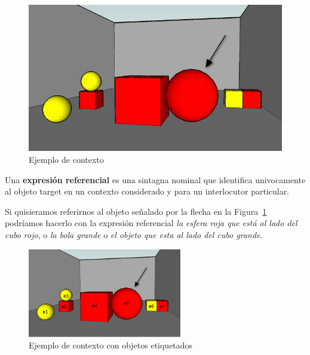  
\begin{figure}[ht]
\centering
\includegraphics[scale=.4]{images/22sinletras.jpg}
\caption{Ejemplo de contexto}
\label{GRE3D7-stimulus1}

\end{figure}

%

Una {\bf expresi\'on referencial} es una sintagna nominal que identifica univocamente al objeto target en un contexto considerado y para un interlocutor particular.

Si quisieramos referirnos al objeto se\~nalado por la flecha en la Figura~\ref{GRE3D7-stimulus1} podr\'iamos hacerlo con la expresi\'on referencial {\it la
esfera roja que est\'a al lado del cubo rojo}, o {\it la bola grande} o {\it el objeto que esta al lado del cubo grande}. 

\begin{figure}[ht]
\centering
\includegraphics[width=0.6\textwidth]{images/22.jpg}
\caption{Ejemplo de contexto con objetos etiquetados}
\label{GRE3D7-stimulus2}
\end{figure}

